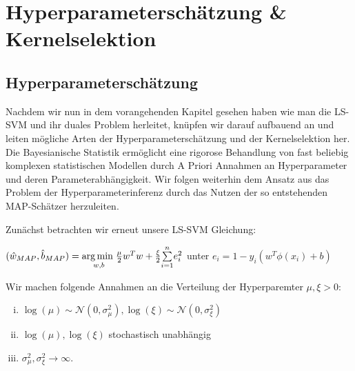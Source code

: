 




\newpage
\thispagestyle{plain}
\section{Hyperparameterschätzung \& Kernelselektion}
\subsection{Hyperparameterschätzung}

Nachdem wir nun in dem vorangehenden Kapitel gesehen haben wie man die LS-SVM und ihr duales Problem herleitet, knüpfen wir darauf aufbauend an und leiten mögliche Arten der Hyperparameterschätzung und der Kernelselektion her. \\
Die Bayesianische Statistik ermöglicht eine rigorose Behandlung von fast beliebig komplexen statistischen Modellen durch A Priori Annahmen an Hyperparameter und deren Parameterabhängigkeit. Wir folgen weiterhin dem Ansatz aus \cite{LS-SVM} das Problem der Hyperparameterinferenz durch das Nutzen der so entstehenden MAP-Schätzer herzuleiten.

Zunächst betrachten wir erneut unsere LS-SVM Gleichung:

\begin{center}
	$(\hat{w}_{MAP},\hat{b}_{MAP})  = \underset{w,b}{\arg \min \hspace{0.1cm}} 					 \frac{\mu}{2}w^Tw + \frac{\xi}{2}\underset{i=1}{\overset{n}{\sum}}e_i^2$
	unter $e_i = 1 - y_i(w^T \phi(x_i) +b)$
\end{center}

Wir machen folgende Annahmen an die Verteilung der Hyperparemter $\mu, \xi >0$:

\begin{enumerate}[(i)]
	\item $\log(\mu) \sim \mathcal{N}(0, \sigma_\mu^2), \log(\xi) \sim \mathcal{N}(0, 				  \sigma_\xi^2)$ 
	\item $\log(\mu), \log(\xi)$ stochastisch unabhängig
	\item $\sigma_\mu^2, \sigma_\xi^2 \rightarrow \infty$.
\end{enumerate}

